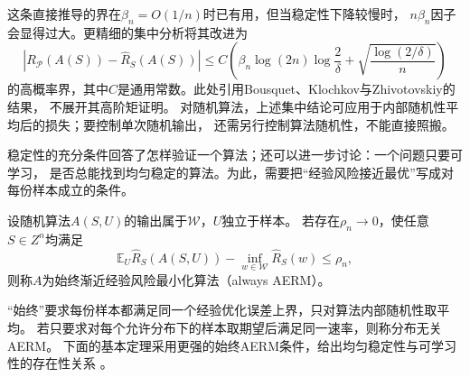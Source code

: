 这条直接推导的界在$\beta_n=O(1/n)$时已有用，但当稳定性下降较慢时，
$n\beta_n$因子会显得过大。更精细的集中分析将其改进为
\[
 |R_{\mathcal P}(A(S))-\hat R_S(A(S))|
 \leq C\!\left(\beta_n\log(2n)\log\frac2\delta
          +\sqrt{\frac{\log(2/\delta)}n}\right)
\]
的高概率界，其中$C$是通用常数。此处引用Bousquet、Klochkov与Zhivotovskiy的结果，
不展开其高阶矩证明。
对随机算法，上述集中结论可应用于内部随机性平均后的损失；要控制单次随机输出，
还需另行控制算法随机性，不能直接照搬。

稳定性的充分条件回答了怎样验证一个算法；还可以进一步讨论：一个问题只要可学习，
是否总能找到均匀稳定的算法。为此，需要把“经验风险接近最优”写成对每份样本成立的条件。

\begin{definition}[始终渐近经验风险最小化]
\label{def:aerm}
设随机算法$A(S,U)$的输出属于$\mathcal W$，$U$独立于样本。
若存在$\rho_n\to0$，使任意$S\in Z^n$均满足
\[
 \mathbb E_U\hat R_S(A(S,U))-\inf_{w\in\mathcal W}\hat R_S(w)\leq\rho_n,
\]
则称$A$为始终渐近经验风险最小化算法（always AERM）。
\end{definition}

“始终”要求每份样本都满足同一个经验优化误差上界，只对算法内部随机性取平均。
若只要求对每个允许分布下的样本取期望后满足同一速率，则称分布无关AERM。
下面的基本定理采用更强的始终AERM条件，给出均匀稳定性与可学习性的存在性关系
。

